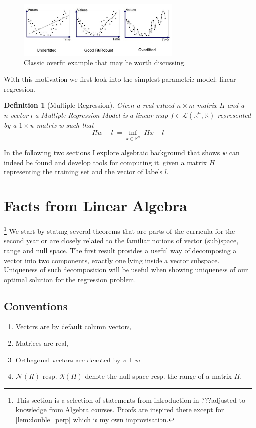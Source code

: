 \documentclass[a4paper]{article}
\theoremstyle{break}
\newtheorem{definition}{Definition}[section]
\newcommand{\bib}{???}
\newcommand{\R}{\mathbb{R}}
\newcommand{\Nu}{\mathcal{N}}
\newcommand{\Ra}{\mathcal{R}}
\begin{document}
\begin{figure}[!htbp]
\begin{center}
    \includegraphics[width=8cm]{overfit_poly.png}
\end{center}
\caption{Classic overfit example that may be worth discussing.}\label{img:overfit}
\end{figure} 

With this motivation we first look into the simplest parametric model: linear regression.

\begin{definition}[Multiple Regression]
    Given a real-valued $ n \times m$ matrix $H$ and a n-vector $l$ a Multiple Regression Model is a linear map $f \in \mathcal{L} ( \R ^n, \R)$ represented by a $ 1 \times n$ matrix $w$ such that
    \begin{equation}\label{def2}
        | H w - l | = \inf\limits_{x \in \R^n} | H x - l |
    \end{equation}
\end{definition}

In the following two sections I explore algebraic background that shows $ w $ can indeed be found and develop tools for computing it, given a matrix $H$ representing the training set and the vector of labels $l$.

\section{Facts from Linear Algebra}

\footnote{This section is a selection of statements from introduction in \bib  adjusted to knowledge from Algebra courses. Proofs are inspired there except for \ref{lem:double_perp} which is my own improvisation.}
We start by stating several theorems that are parts of the curricula for the second year or are closely related to the familiar notions of vector (sub)space, range and null space. The first result provides a useful way of decomposing a vector into two components, exactly one lying inside a vector subspace. Uniqueness of such decomposition will be useful when showing uniqueness of our optimal solution for the regression problem.

\subsection{Conventions}
\begin{enumerate}
    \item Vectors are by default column vectors,
    \item Matrices are real,
    \item Orthogonal vectors are denoted by $ v \perp w$
    \item $\Nu(H)$ resp. $\Ra(H)$ denote the null space resp. the range of a matrix $H$.
\end{enumerate}
\end{document}
